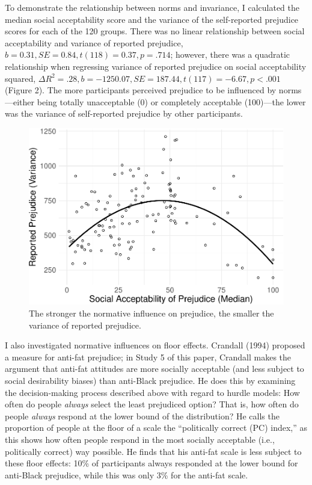 \documentclass[english,man]{apa6}
\theoremstyle{definition}
\theoremstyle{definition}
\theoremstyle{remark}
\begin{document}
To demonstrate the relationship between norms and invariance, I
calculated the median social acceptability score and the variance of the
self-reported prejudice scores for each of the 120 groups. There was no
linear relationship between social acceptability and variance of
reported prejudice, \(b = 0.31, SE = 0.84, t(118) = 0.37, p = .714\);
however, there was a quadratic relationship when regressing variance of
reported prejudice on social acceptability squared,
\(\Delta R^2 = .28, b = -1250.07, SE = 187.44, t(117) = -6.67, p < .001\)
(Figure 2). The more participants perceived prejudice to be influenced
by norms---either being totally unacceptable (0) or completely
acceptable (100)---the lower was the variance of self-reported prejudice
by other participants.

\begin{figure}
\centering
\includegraphics{beta_hurdle_files/figure-latex/unnamed-chunk-3-1.pdf}
\caption{\label{fig:unnamed-chunk-3}The stronger the normative influence on
prejudice, the smaller the variance of reported prejudice.}
\end{figure}

I also investigated normative influences on floor effects. Crandall
(1994) proposed a measure for anti-fat prejudice; in Study 5 of this
paper, Crandall makes the argument that anti-fat attitudes are more
socially acceptable (and less subject to social desirability biases)
than anti-Black prejudice. He does this by examining the decision-making
process described above with regard to hurdle models: How often do
people \emph{always} select the least prejudiced option? That is, how
often do people \emph{always} respond at the lower bound of the
distribution? He calls the proportion of people at the floor of a scale
the \enquote{politically correct (PC) index,} as this shows how often
people respond in the most socially acceptable (i.e., politically
correct) way possible. He finds that his anti-fat scale is less subject
to these floor effects: 10\% of participants always responded at the
lower bound for anti-Black prejudice, while this was only 3\% for the
anti-fat scale.
\end{document}
